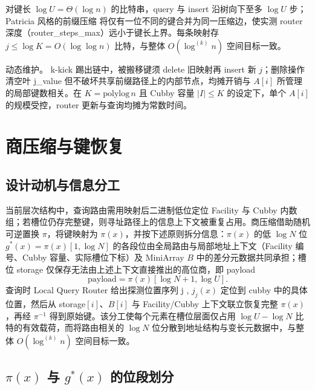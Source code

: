 对键长 \(\log U=\Theta(\log n)\) 的比特串，query 与 insert 沿树向下至多 \(\log U\) 步；Patricia 风格的前缀压缩\cite{morrison1968,pagh2008retrieval,lehmann2025combined} 将仅有一位不同的键合并为同一压缩边，使实测 router 深度（router\_steps\_max）远小于键长上界。每条映射存 \(j\le\log K=O(\log\log n)\) 比特，与整体 \(O(\log^{(k)}n)\) 空间目标一致\cite{bender2022otsh,kuszmaul2024filters}。

动态维护。 k-kick 踢出链中，被搬移键须 delete 旧映射再 insert 新 \(j\)；删除操作清空叶 j\_value 但不破坏共享前缀路径上的内部节点，均摊开销与 \(A[i]\) 所管理的局部键数相关。在 \(K=\mathrm{polylog}\,n\) 且 Cubby 容量 \(|I|\le K\) 的设定下，单个 \(A[i]\) 的规模受控，router 更新与查询均摊为常数时间\cite{bender2022otsh,bender2024sosa}。

\section{商压缩与键恢复}

\subsection{设计动机与信息分工}

当前层次结构中，查询路由需用映射后二进制低位定位 Facility 与 Cubby 内数组；若槽位仍存完整键，则寻址路径上的信息上下文被重复占用。商压缩借助随机可逆置换 \(\pi\)，将键映射为 \(\pi(x)\)，并按下述原则拆分信息：\(\pi(x)\) 的低 \(\log N\) 位 \(g^\ast(x)=\pi(x)[1,\log N]\) 的各段位由全局路由与局部地址上下文（Facility 编号、Cubby 容量、实际槽位下标）及 MiniArray \(B\) 中的差分元数据共同承担；槽位 storage 仅保存无法由上述上下文直接推出的高位商，即 payload
\[
  \mathrm{payload}=\pi(x)[\log N+1,\log U].
\]
查询时 Local Query Router 给出探测位置序列 j , \(j_j(x)\) 定位到 cubby 中的具体位置，然后从 storage\([i]\)、\(B[i]\) 与 Facility/Cubby 上下文联立恢复完整 \(\pi(x)\)，再经 \(\pi^{-1}\) 得到原始键。该分工使每个元素在槽位层面仅占用 \(\log U-\log N\) 比特的有效载荷，而将路由相关的 \(\log N\) 位分散到地址结构与变长元数据中，与整体 \(O(\log^{(k)}n)\) 空间目标一致\cite{bender2022otsh,pagh2008retrieval}。

\subsection{\texorpdfstring{\(\pi(x)\) 与 \(g^\ast(x)\) 的位段划分}{pi(x) 与 g*(x) 的位段划分}}

